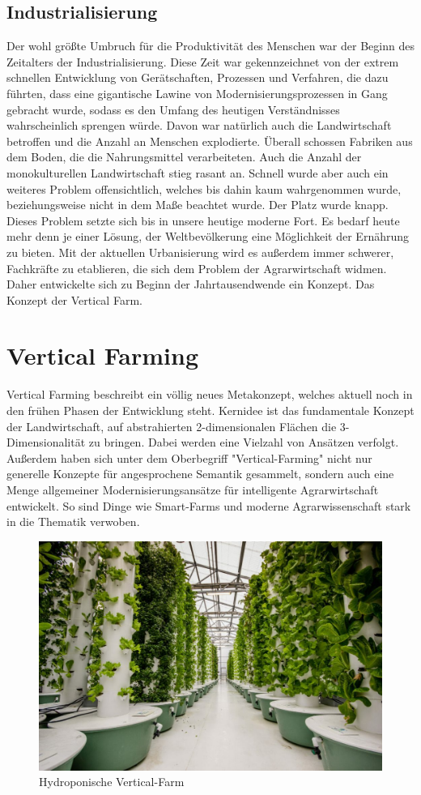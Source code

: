 \subsection{Industrialisierung}
Der wohl größte Umbruch für die Produktivität des Menschen war der Beginn des Zeitalters der Industrialisierung. Diese Zeit war gekennzeichnet von der extrem schnellen Entwicklung von Gerätschaften, Prozessen und Verfahren, die dazu führten, dass eine gigantische Lawine von Modernisierungsprozessen in Gang gebracht wurde, sodass es den Umfang des heutigen Verständnisses wahrscheinlich sprengen würde. Davon war natürlich auch die Landwirtschaft betroffen und die Anzahl an Menschen explodierte. Überall schossen Fabriken aus dem Boden, die die Nahrungsmittel verarbeiteten. Auch die Anzahl der monokulturellen Landwirtschaft stieg rasant an. Schnell wurde aber auch ein weiteres Problem offensichtlich, welches bis dahin kaum wahrgenommen wurde, beziehungsweise nicht in dem Maße beachtet wurde. Der Platz wurde knapp. Dieses Problem setzte sich bis in unsere heutige moderne Fort. Es bedarf heute mehr denn je einer Lösung, der Weltbevölkerung eine Möglichkeit der Ernährung zu bieten. \cite{Grünewald+2019+147+153} Mit der aktuellen Urbanisierung wird es außerdem immer schwerer, Fachkräfte zu etablieren, die sich dem Problem der Agrarwirtschaft widmen. Daher entwickelte sich zu Beginn der Jahrtausendwende ein Konzept. Das Konzept der Vertical Farm.

\section{Vertical Farming}
Vertical Farming beschreibt ein völlig neues Metakonzept, welches aktuell noch in den frühen Phasen der Entwicklung steht. Kernidee ist das fundamentale Konzept der Landwirtschaft, auf abstrahierten 2-dimensionalen Flächen die 3-Dimensionalität zu bringen. Dabei werden eine Vielzahl von Ansätzen verfolgt. Außerdem haben sich unter dem Oberbegriff "Vertical-Farming" nicht nur generelle Konzepte für angesprochene Semantik gesammelt, sondern auch eine Menge allgemeiner Modernisierungsansätze für intelligente Agrarwirtschaft entwickelt. So sind Dinge wie Smart-Farms und moderne Agrarwissenschaft stark in die Thematik verwoben. 
\begin{figure}
    \centering
    \includegraphics[width=0.9\linewidth]{aeroponics-1200x800-1-1024x683.jpeg}
    \caption{Hydroponische Vertical-Farm}
    \label{fig:enter-label}
\end{figure}

